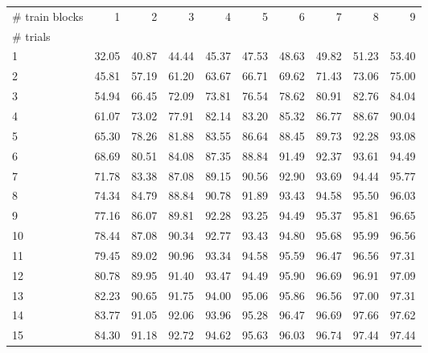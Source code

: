\begin{tabularx}{\textwidth}{@{}Xrrrrrrrrr@{}}
\toprule
\# train blocks & 1 & 2 & 3 & 4 & 5 & 6 & 7 & 8 & 9 \\
\# trials &  &  &  &  &  &  &  &  &  \\
\midrule
1 & 32.05 & 40.87 & 44.44 & 45.37 & 47.53 & 48.63 & 49.82 & 51.23 & 53.40 \\
2 & 45.81 & 57.19 & 61.20 & 63.67 & 66.71 & 69.62 & 71.43 & 73.06 & 75.00 \\
3 & 54.94 & 66.45 & 72.09 & 73.81 & 76.54 & 78.62 & 80.91 & 82.76 & 84.04 \\
4 & 61.07 & 73.02 & 77.91 & 82.14 & 83.20 & 85.32 & 86.77 & 88.67 & 90.04 \\
5 & 65.30 & 78.26 & 81.88 & 83.55 & 86.64 & 88.45 & 89.73 & 92.28 & 93.08 \\
6 & 68.69 & 80.51 & 84.08 & 87.35 & 88.84 & 91.49 & 92.37 & 93.61 & 94.49 \\
7 & 71.78 & 83.38 & 87.08 & 89.15 & 90.56 & 92.90 & 93.69 & 94.44 & 95.77 \\
8 & 74.34 & 84.79 & 88.84 & 90.78 & 91.89 & 93.43 & 94.58 & 95.50 & 96.03 \\
9 & 77.16 & 86.07 & 89.81 & 92.28 & 93.25 & 94.49 & 95.37 & 95.81 & 96.65 \\
10 & 78.44 & 87.08 & 90.34 & 92.77 & 93.43 & 94.80 & 95.68 & 95.99 & 96.56 \\
11 & 79.45 & 89.02 & 90.96 & 93.34 & 94.58 & 95.59 & 96.47 & 96.56 & 97.31 \\
12 & 80.78 & 89.95 & 91.40 & 93.47 & 94.49 & 95.90 & 96.69 & 96.91 & 97.09 \\
13 & 82.23 & 90.65 & 91.75 & 94.00 & 95.06 & 95.86 & 96.56 & 97.00 & 97.31 \\
14 & 83.77 & 91.05 & 92.06 & 93.96 & 95.28 & 96.47 & 96.69 & 97.66 & 97.62 \\
15 & 84.30 & 91.18 & 92.72 & 94.62 & 95.63 & 96.03 & 96.74 & 97.44 & 97.44 \\
\bottomrule
\end{tabularx}
